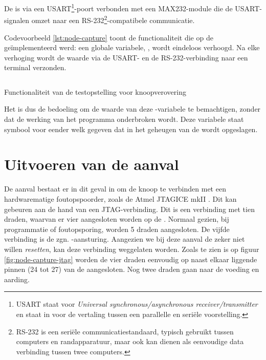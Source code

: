 De \mcu is via een USART\footnote{USART staat voor \emph{Universal
synchronous/asynchronous receiver/transmitter} en staat in voor de vertaling
tussen een parallelle en seri\"ele voorstelling.}-poort verbonden met een
MAX232-module \citep{datasheet:max232} die de USART-signalen omzet naar een
RS-232\footnote{RS-232 is een seri\"ele communicatiestandaard, typisch gebruikt
tussen computers en randapparatuur, maar ook kan dienen als eenvoudige data
verbinding tussen twee computers.}-compatibele communicatie.

Codevoorbeeld \ref{lst:node-capture} toont de functionaliteit die op de \mcu
ge\"implementeerd werd: een globale variabele, , wordt eindeloos
verhoogd. Na elke verhoging wordt de waarde via de USART- en de
RS-232-verbinding naar een terminal verzonden.

\begin{listing}[ht]
  \inputminted[linenos,frame=lines,framesep=2mm,fontsize=\footnotesize]{c}{../src/node-capture/main.c}
  \vspace{-5mm}
  \caption{Functionaliteit van de testopstelling voor knoopverovering}
  \label{lst:node-capture}
\end{listing}

Het is dus de bedoeling om de waarde van deze -variabele te
bemachtigen, zonder dat de werking van het programma onderbroken wordt. Deze
variabele staat symbool voor eender welk gegeven dat in het geheugen van de
\mcu wordt opgeslagen.

\vspace{-3mm}

\section{Uitvoeren van de aanval}

De aanval bestaat er in dit geval in om de knoop te verbinden met een
hardwarematige foutopspoorder, zoals de Atmel JTAGICE mkII
\citep{manual:jtagicemkii}. Dit kan gebeuren aan de hand van een
JTAG-verbinding. Dit is een verbinding met tien draden, waarvan er vier
aangesloten worden op de \mcu. Normaal gezien, bij programmatie of
foutopsporing, worden 5 draden aangesloten. De vijfde verbinding is de zgn.
-aansturing. Aangezien we bij deze aanval de \mcu zeker niet willen
\emph{resetten}, kan deze verbinding weggelaten worden. Zoals te zien is op
figuur \ref{fig:node-capture-jtag} worden de vier draden eenvoudig op naast
elkaar liggende pinnen (24 tot 27) van de \mcu aangesloten. Nog twee draden
gaan naar de voeding en aarding.

